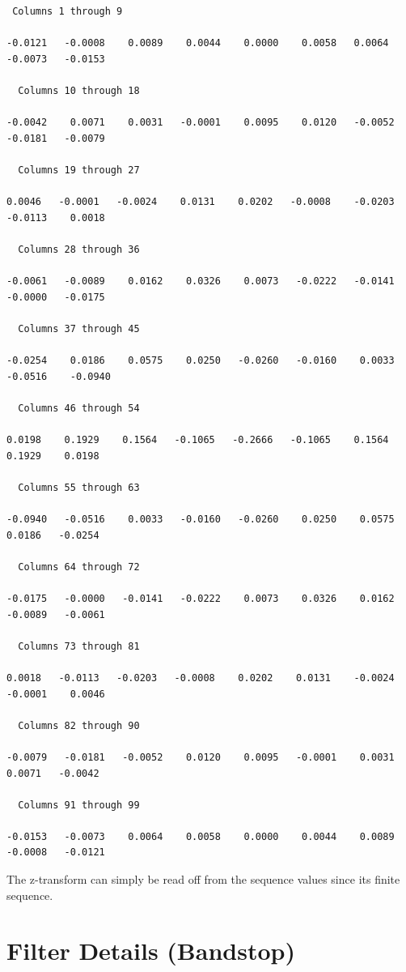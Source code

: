 \documentclass{article}
\begin{document}
\begin{verbatim}
 Columns 1 through 9

-0.0121   -0.0008    0.0089    0.0044    0.0000    0.0058   0.0064   -0.0073   -0.0153

  Columns 10 through 18

-0.0042    0.0071    0.0031   -0.0001    0.0095    0.0120   -0.0052   -0.0181   -0.0079    

  Columns 19 through 27

0.0046   -0.0001   -0.0024    0.0131    0.0202   -0.0008    -0.0203   -0.0113    0.0018

  Columns 28 through 36

-0.0061   -0.0089    0.0162    0.0326    0.0073   -0.0222   -0.0141   -0.0000   -0.0175

  Columns 37 through 45

-0.0254    0.0186    0.0575    0.0250   -0.0260   -0.0160    0.0033   -0.0516    -0.0940

  Columns 46 through 54

0.0198    0.1929    0.1564   -0.1065   -0.2666   -0.1065    0.1564    0.1929    0.0198

  Columns 55 through 63

-0.0940   -0.0516    0.0033   -0.0160   -0.0260    0.0250    0.0575    0.0186   -0.0254

  Columns 64 through 72

-0.0175   -0.0000   -0.0141   -0.0222    0.0073    0.0326    0.0162   -0.0089   -0.0061

  Columns 73 through 81

0.0018   -0.0113   -0.0203   -0.0008    0.0202    0.0131    -0.0024   -0.0001    0.0046

  Columns 82 through 90

-0.0079   -0.0181   -0.0052    0.0120    0.0095   -0.0001    0.0031    0.0071   -0.0042

  Columns 91 through 99

-0.0153   -0.0073    0.0064    0.0058    0.0000    0.0044    0.0089   -0.0008   -0.0121
\end{verbatim}

\vspace{5mm}

The z-transform can simply be read off from the sequence values since its finite sequence.
\clearpage

\section{Filter Details (Bandstop)}
\end{document}

